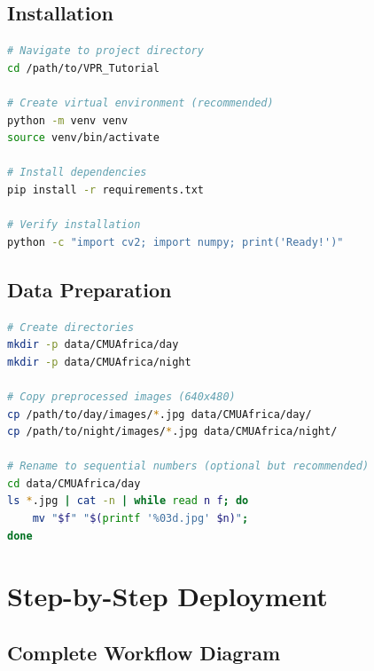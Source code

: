 \documentclass[11pt,a4paper]{article}
\begin{document}
\subsection{Installation}

\begin{lstlisting}[language=bash, caption=Installation commands]
# Navigate to project directory
cd /path/to/VPR_Tutorial

# Create virtual environment (recommended)
python -m venv venv
source venv/bin/activate

# Install dependencies
pip install -r requirements.txt

# Verify installation
python -c "import cv2; import numpy; print('Ready!')"
\end{lstlisting}

\subsection{Data Preparation}

\begin{lstlisting}[language=bash, caption=Organizing the CMU-Africa dataset]
# Create directories
mkdir -p data/CMUAfrica/day
mkdir -p data/CMUAfrica/night

# Copy preprocessed images (640x480)
cp /path/to/day/images/*.jpg data/CMUAfrica/day/
cp /path/to/night/images/*.jpg data/CMUAfrica/night/

# Rename to sequential numbers (optional but recommended)
cd data/CMUAfrica/day
ls *.jpg | cat -n | while read n f; do
    mv "$f" "$(printf '%03d.jpg' $n)";
done
\end{lstlisting}

\newpage
\section{Step-by-Step Deployment}

\subsection{Complete Workflow Diagram}
\end{document}
